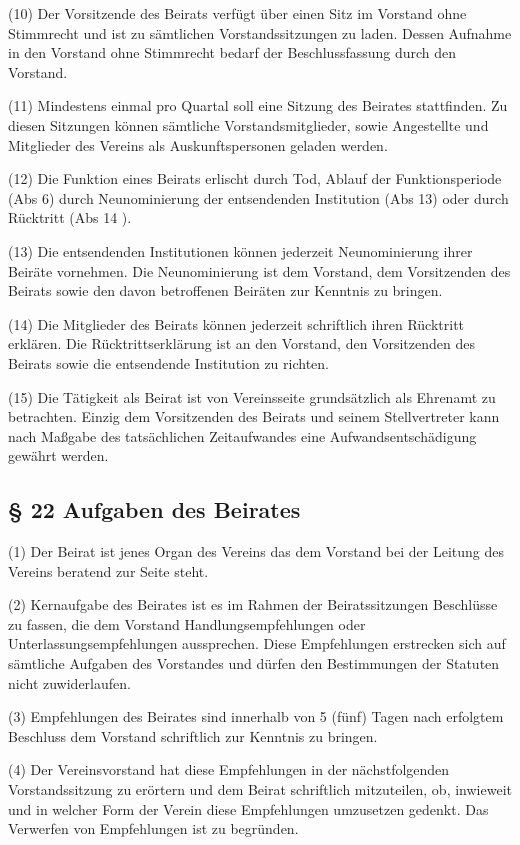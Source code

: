 \documentclass[11pt,a4paper]{article}
\begin{document}
(10)
Der Vorsitzende des Beirats verfügt über einen Sitz im Vorstand ohne Stimmrecht und ist zu sämtlichen Vorstandssitzungen zu laden.
Dessen Aufnahme in den Vorstand ohne Stimmrecht bedarf der Beschlussfassung durch den Vorstand.

(11)
Mindestens einmal pro Quartal soll eine Sitzung des Beirates stattfinden.
Zu diesen Sitzungen können sämtliche Vorstandsmitglieder, sowie Angestellte und Mitglieder des Vereins als Auskunftspersonen geladen werden.

(12)
Die Funktion eines Beirats erlischt durch Tod, Ablauf der Funktionsperiode (Abs 6) durch Neunominierung der entsendenden Institution (Abs 13) oder durch Rücktritt (Abs 14 ).

(13)
Die entsendenden Institutionen können jederzeit Neunominierung ihrer Beiräte vornehmen.
Die Neunominierung ist dem Vorstand, dem Vorsitzenden des Beirats sowie den davon betroffenen Beiräten zur Kenntnis zu bringen.

(14)
Die Mitglieder des Beirats können jederzeit schriftlich ihren Rücktritt erklären.
Die Rücktrittserklärung ist an den Vorstand, den Vorsitzenden des Beirats sowie die entsendende Institution zu richten.

(15)
Die Tätigkeit als Beirat ist von Vereinsseite grundsätzlich als Ehrenamt zu betrachten.
Einzig dem Vorsitzenden des Beirats und seinem Stellvertreter kann nach Maßgabe des tatsächlichen Zeitaufwandes eine Aufwandsentschädigung gewährt werden.

\subsection{§ 22
Aufgaben des Beirates}

(1)
Der Beirat ist jenes Organ des Vereins das dem Vorstand bei der Leitung des Vereins beratend zur Seite steht.

(2)
Kernaufgabe des Beirates ist es im Rahmen der Beiratssitzungen Beschlüsse zu fassen, die dem Vorstand Handlungsempfehlungen oder Unterlassungsempfehlungen aussprechen.
Diese Empfehlungen erstrecken sich auf sämtliche Aufgaben des Vorstandes und dürfen den Bestimmungen der Statuten nicht zuwiderlaufen.

(3)
Empfehlungen des Beirates sind innerhalb von 5 (fünf) Tagen nach erfolgtem Beschluss dem Vorstand schriftlich zur Kenntnis zu bringen.

(4)
Der Vereinsvorstand hat diese Empfehlungen in der nächstfolgenden Vorstandssitzung zu erörtern und dem Beirat schriftlich mitzuteilen, ob, inwieweit und in welcher Form der Verein diese Empfehlungen umzusetzen gedenkt.
Das Verwerfen von Empfehlungen ist zu begründen.
\end{document}
